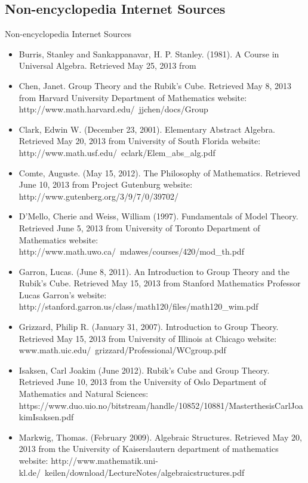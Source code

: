 \documentclass{beamer}
\begin{document}
			\subsection{Non-encyclopedia Internet Sources}

				\begin{frame}[allowframebreaks]{Non-encyclopedia Internet Sources}
				\begin{itemize}
				\item Burris, Stanley and Sankappanavar, H. P. Stanley. (1981). A Course in Universal Algebra. Retrieved May 25, 2013 from
				\item Chen, Janet. Group Theory and the Rubik’s Cube. Retrieved May 8, 2013 from Harvard University Department of Mathematics website: http://www.math.harvard.edu/~jjchen/docs/Group%
				\item Clark, Edwin W. (December 23, 2001). Elementary Abstract Algebra. Retrieved May 20, 2013 from University of South Florida website: http://www.math.usf.edu/~eclark/Elem\_abs\_alg.pdf
				\item Comte, Auguste. (May 15, 2012). The Philosophy of Mathematics. Retrieved June 10, 2013 from Project Gutenburg website: http://www.gutenberg.org/3/9/7/0/39702/
				\item D’Mello, Cherie and Weiss, William (1997). Fundamentals of Model Theory. Retrieved June 5, 2013 from University of Toronto Department of Mathematics website: http://www.math.uwo.ca/~mdawes/courses/420/mod\_th.pdf
				\item Garron, Lucas. (June 8, 2011). An Introduction to Group Theory and the Rubik's Cube. Retrieved May 15, 2013 from Stanford Mathematics Professor Lucas Garron’s website: http://stanford.garron.us/class/math120/files/math120\_wim.pdf
				\item Grizzard, Philip R. (January 31, 2007). Introduction to Group Theory. Retrieved May 15, 2013 from University of Illinois at Chicago website: www.math.uic.edu/~grizzard/Professional/WCgroup.pdf
				\item Isaksen, Carl Joakim (June 2012). Rubik’s Cube and Group Theory. Retrieved June 10, 2013 from the University of Oslo Department of Mathematics and Natural Sciences: https://www.duo.uio.no/bitstream/handle/10852/10881/MasterthesisCarlJoakimIsaksen.pdf
				\item Markwig, Thomas. (February 2009). Algebraic Structures. Retrieved May 20, 2013 from the University of Kaiserslautern department of mathematics website: http://www.mathematik.uni-kl.de/~keilen/download/LectureNotes/algebraicstructures.pdf

\end{itemize}
\end{frame}
\end{document}
